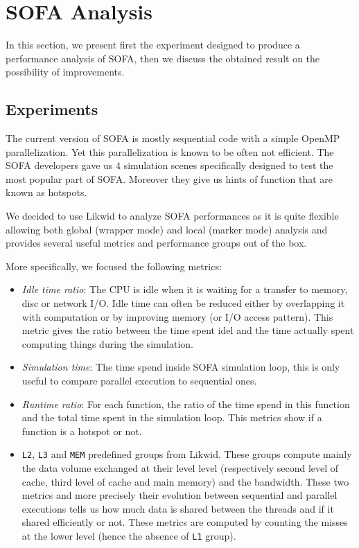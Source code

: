 \section{SOFA Analysis}
\label{sec:sofa}

In this section, we present first the experiment designed to produce a
performance analysis of \gls{SOFA}, then we discuss the obtained result on the
possibility of improvements.

\subsection{Experiments}

The current version of \gls{SOFA} is mostly sequential code with a simple
\gls{OpenMP} parallelization. Yet this parallelization is known to be often
not efficient. The \gls{SOFA} developers gave us $4$ simulation scenes
specifically designed to test the most popular part of \gls{SOFA}. Moreover
they give us hints of function that are known as hotspots.

We decided to use \gls{Likwid} to analyze \gls{SOFA} performances as it is
quite flexible allowing both global (wrapper mode) and local (marker mode)
analysis and provides several useful metrics and performance groups out of the
box.

More specifically, we focused the following metrics:
\begin{itemize}
    \item \emph{Idle time ratio}: The CPU is idle when it is waiting for a
        transfer to memory,  disc or network \gls{I/O}.
        Idle time can often be reduced either by overlapping it with
        computation or by improving memory (or \gls{I/O} access pattern). This
        metric gives the ratio between the time spent idel and the time
        actually spent computing things during the simulation.
    \item \emph{Simulation time}: The time spend inside \gls{SOFA} simulation loop,
        this is only useful to compare parallel execution to sequential ones.
    \item \emph{Runtime ratio}: For each function, the ratio of the time spend
        in this function and the total time spent in the simulation loop. This
        metrics show if a function is a hotspot or not.
    \item \texttt{L2}, \texttt{L3} and \texttt{MEM} predefined groups from
        \gls{Likwid}. These groups compute mainly the data volume exchanged at
        their level level (respectively second level of cache, third level of
        cache and main memory) and the bandwidth. These two metrics and more
        precisely their evolution between sequential and parallel executions
        tells us how much data is shared between the threads and if it shared
        efficiently or not. These metrics are computed by counting the misses
        at the lower level (hence the absence of \texttt{L1} group).
\end{itemize}

